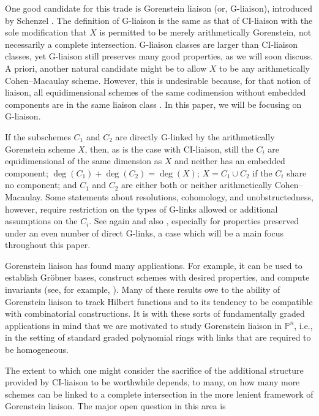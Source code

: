 \documentclass[12pt, reqno]{amsart}
\numberwithin{equation}{section}
\newtheorem{Main Conjecture}[theorem]{Main Conjecture}
\theoremstyle{definition}
\theoremstyle{plain}
\newcommand{\PP}{\mathbb{P}}
\begin{document}
One good candidate for this trade is Gorenstein liaison (or, G-liaison), introduced by Schenzel \cite{Sch83}. The definition of G-liaison is the same as that of CI-liaison with the sole modification that $X$ is permitted to be merely arithmetically Gorenstein, not necessarily a complete intersection. G-liaison classes are larger than CI-liaison classes, yet G-liaison still preserves many good properties, as we will soon discuss. A priori, another natural candidate might be to allow $X$ to be any arithmetically Cohen--Macaulay scheme.  However,  this is undesirable because, for that notion of liaison, all equidimensional schemes of the same codimension without embedded components are in the same liaison class \cite[Corollary 0.3]{Wal93}. In this paper, we will be focusing on G-liaison.

 If the subschemes $C_1$ and $C_2$ are directly G-linked by the arithmetically Gorenstein scheme $X$, then, as is the case with CI-liaison, still the $C_i$ are equidimensional of the same dimension as $X$ and neither has an embedded component; $\deg(C_1)+\deg(C_2) = \deg(X)$; $X = C_1 \cup C_2$ if the $C_i$ share no component; and $C_1$ and $C_2$ are either both or neither arithmetically Cohen--Macaulay.  Some statements about resolutions, cohomology, and unobstructedness, however, require restriction on the types of G-links allowed or additional assumptions on the $C_i$.  See again \cite{KMM+01} and also \cite{Nag98}, especially for properties preserved under an even number of direct G-links, a case which will be a main focus throughout this paper.  

Gorenstein liaison has found many applications. For example, it can be used to establish Gr\"obner bases, construct schemes with desired properties, and compute invariants (see, for example, \cite{MN03, CN09, DG11, GMN13, GN14, CNP+17, FGM18, FK20, KLL+20, CDF+, KW, Kle23, Ney23, NRV}). Many of these results owe to the ability of Gorenstein liaison to track Hilbert functions and to its tendency to be compatible with combinatorial constructions.  It is with these sorts of fundamentally graded applications in mind that we are motivated to study Gorenstein liaison in $\PP^n$, i.e., in the setting of standard graded polynomial rings with links that are required to be homogeneous.


The extent to which one might consider the sacrifice of the additional structure provided by CI-liaison to be worthwhile depends, to many, on how many more schemes can be linked to a complete intersection in the more lenient framework of Gorenstein liaison.  The major open question in this area is 
\end{document}
